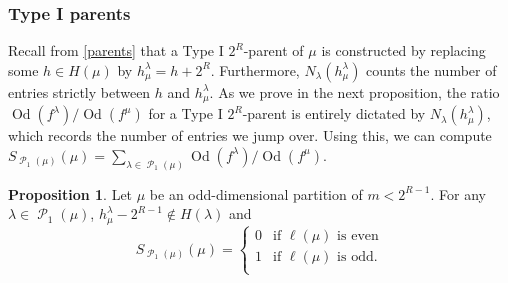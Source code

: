 \documentclass[12pt]{amsart}
\theoremstyle{definition}
\newtheorem{proposition}[theorem]{Proposition}
\numberwithin{equation}{section}
\newcommand{\la}{\lambda}
\DeclareMathOperator{\p}{\mathcal{P}}
\DeclareMathOperator{\Od}{Od}
\begin{document}
\subsubsection{Type I parents}
Recall from \cref{parents} that a Type I $2^R$-parent of $\mu$ is constructed by replacing some $h\in H(\mu)$ by $h^\lambda_\mu = h + 2^R$. Furthermore, $N_\la(h^\la_\mu)$ counts the number of entries strictly between $h$ and $h^\la_\mu$. As we prove in the next proposition, the ratio $\Od(f^\la)/\Od(f^\mu)$ for a Type I $2^R$-parent is entirely dictated by $N_\la(h^\la_\mu)$, which records the number of entries we jump over. Using this, we can compute $S_{\p_1(\mu)}(\mu) = \sum_{\la\in \p_1(\mu)} \Od(f^\la)/\Od(f^\mu)$.

\begin{proposition}\label{prop:type1}
Let $\mu$ be an odd-dimensional partition of $m < 2^{R-1}$. For any $\lambda\in \p_1(\mu)$, $h_\mu^\lambda -  2^{R-1} \not\in H(\lambda)$ and \[S_{\p_1(\mu)}(\mu) = \begin{cases}
    0 & \text{if } \ell(\mu) \text{ is even}\\
    1 & \text{if } \ell(\mu) \text{ is odd}.\\
\end{cases}\]
\end{proposition}
\end{document}
